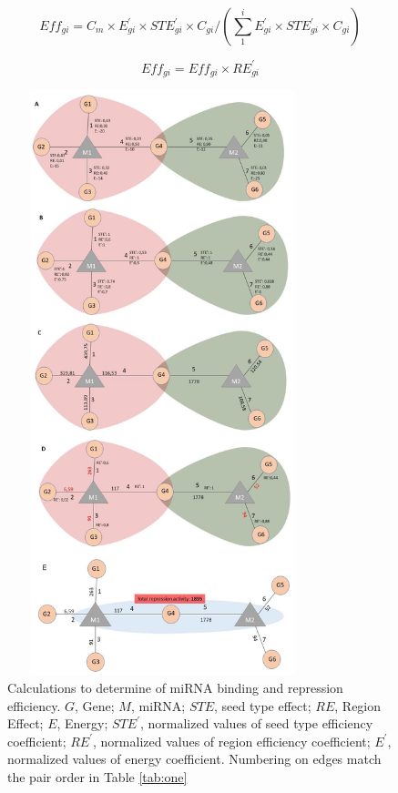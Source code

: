 \documentclass[a4,center,fleqn]{NAR}
\begin{document}
\begin{equation}
Eff_{gi}= C_m \times E^\prime_{gi} \times STE^\prime_{gi} \times C_{gi}/(\sum_{1}^{i} E^\prime_{gi} \times STE^\prime_{gi} \times C_{gi}) \tag{3}\label{eq:3}
\end{equation}

\begin{equation}
Eff_{gi}= Eff_{gi}\times RE^\prime_{gi} \tag{4}\label{eq:4}
\end{equation}

\begin{figure}[ht]
\begin{center}
\includegraphics[width=9cm,height=17cm]{Fig2.eps}
\end{center}
\caption{Calculations to determine of miRNA binding and repression efficiency. $G$, Gene; $M$, miRNA; $STE$, seed type effect; $RE$, Region Effect; $E$, Energy; $STE^\prime$, normalized values of seed type efficiency coefficient; $RE^\prime$, normalized values of region efficiency coefficient; $E^\prime$, normalized values of energy coefficient. Numbering on edges match the pair order in Table \ref{tab:one} }
\label{fig:fig2}
\end{figure}
\end{document}
